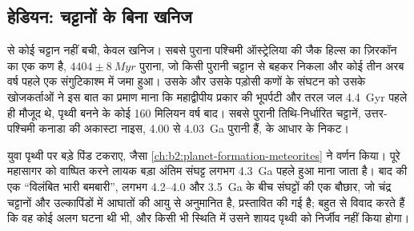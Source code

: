\begin{omfigure}
\par{}
\end{omfigure}

\subsection*{हेडियन: चट्टानों के बिना खनिज}

 से कोई चट्टान नहीं बची, केवल खनिज। सबसे पुराना पश्चिमी ऑस्ट्रेलिया की जैक
हिल्स का ज़िरकॉन का एक कण है, $4404 \pm \qty{8}{Myr}$ पुराना, जो किसी पुरानी चट्टान से बहकर निकला और
कोई तीन अरब वर्ष पहले एक संगुटिकाश्म में जमा हुआ। उसके और उसके पड़ोसी कणों के संघटन को
उसके खोजकर्ताओं ने इस बात का प्रमाण माना कि महाद्वीपीय प्रकार की भूपर्पटी और
तरल जल \qty{4.4}{Gyr} पहले ही मौजूद थे, पृथ्वी बनने के कोई 160 मिलियन वर्ष बाद।
सबसे पुरानी तिथि-निर्धारित चट्टानें, उत्तर-पश्चिमी कनाडा की अकास्टा नाइस, 4.00 से
\qty{4.03}{Ga} पुरानी हैं,  के आधार के निकट।

युवा पृथ्वी पर बड़े पिंड टकराए, जैसा \cref{ch:b2:planet-formation-meteorites}
ने वर्णन किया। पूरे महासागर को वाष्पित करने लायक बड़ा अंतिम संघट्ट
लगभग \qty{4.3}{Ga} पहले हुआ माना जाता है। बाद की एक ``विलंबित भारी
बमबारी'', लगभग 4.2--4.0 और \qty{3.5}{Ga} के बीच संघट्टों की एक बौछार, जो
चंद्र चट्टानों और उल्कापिंडों में आघातों की आयु से अनुमानित है, प्रस्तावित की गई है; बहुत से विवाद करते हैं कि वह
कोई अलग घटना थी भी, और किसी भी स्थिति में उसने शायद पृथ्वी को निर्जीव नहीं किया होगा।

